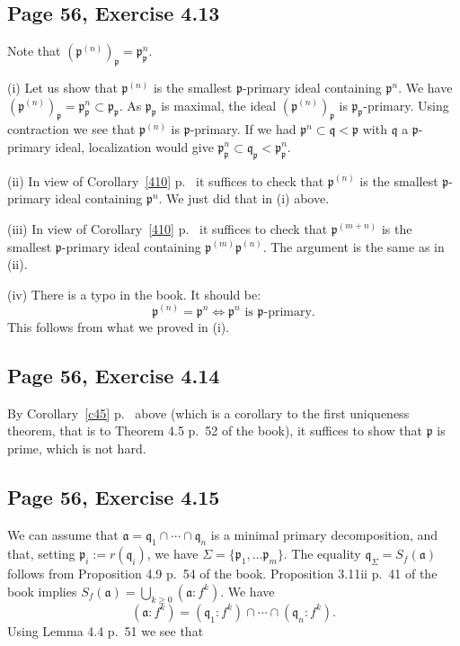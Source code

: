 \documentclass[parskip=half,fontsize=12pt]{scrartcl}%
\newcommand{\mf}{\mathfrak}
\newcommand{\aaa}{\mf a}
\newcommand{\ppp}{\mf p}
\newcommand{\qqq}{\mf q}
\begin{document}
\subsection{Page 56, Exercise 4.13}%

Note that $(\ppp^{(n)})_\ppp=\ppp_\ppp^n$.

(i) Let us show that $\ppp^{(n)}$ is the smallest $\ppp$-primary ideal containing $\ppp^n$. We have $(\ppp^{(n)})_\ppp=\ppp_\ppp^n\subset\ppp_\ppp$. As $\ppp_\ppp$ is maximal, the ideal $(\ppp^{(n)})_\ppp$ is $\ppp_\ppp$-primary. Using contraction we see that $\ppp^{(n)}$ is $\ppp$-primary. If we had $\ppp^n\subset\qqq<\ppp$ with $\qqq$ a $\ppp$-primary ideal, localization would give $\ppp_\ppp^n\subset\qqq_\ppp<\ppp_\ppp^n$.

(ii) In view of Corollary~\ref{410} p.~\pageref{410} it suffices to check that $\ppp^{(n)}$ is the smallest $\ppp$-primary ideal containing $\ppp^n$. We just did that in (i) above.

(iii) In view of Corollary~\ref{410} p.~\pageref{410} it suffices to check that $\ppp^{(m+n)}$ is the smallest $\ppp$-primary ideal containing $\ppp^{(m)}\ppp^{(n)}$. The argument is the same as in (ii).

(iv) There is a typo in the book. It should be: 
$$
\ppp^{(n)}=\ppp^n\iff\ppp^n\text{ is }\ppp\text{-primary.}
$$ 
This follows from what we proved in (i).

\subsection{Page 56, Exercise 4.14}%

By Corollary~\ref{c45} p.~\pageref{c45} above (which is a corollary to the first uniqueness theorem, that is to Theorem 4.5 p.~52 of the book), it suffices to show that $\ppp$ is prime, which is not hard.

\subsection{Page 56, Exercise 4.15}%

We can assume that $\aaa=\qqq_1\cap\cdots\cap\qqq_n$ is a minimal primary decomposition, and that, setting $\ppp_i:=r(\qqq_i)$, we have $\Sigma=\{\ppp_1,\dots\ppp_m\}$. The equality $\qqq_\Sigma=S_f(\aaa)$ follows from Proposition 4.9 p.~54 of the book. Proposition 3.11ii p.~41 of the book implies $S_f(\aaa)=\bigcup_{k\ge0}(\aaa:f^k)$. We have 
\begin{equation}\label{afk}
(\aaa:f^k)=(\qqq_1:f^k)\cap\cdots\cap(\qqq_n:f^k).
\end{equation} 
Using Lemma 4.4 p.~51 we see that  
\end{document}

